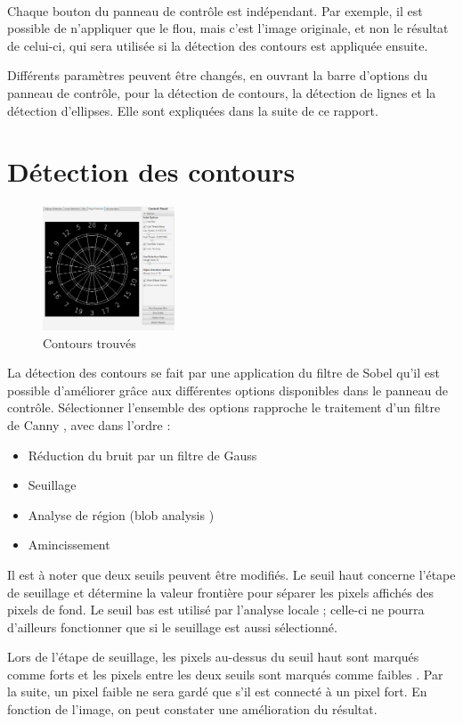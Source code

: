 \documentclass[a4paper, 11pt]{article}
\begin{document}
\paragraph{}
Chaque bouton du panneau de contrôle est indépendant. Par exemple, il est possible de n'appliquer que le flou, mais c'est l'image originale, et non le résultat de celui-ci, qui sera utilisée si la détection des contours est appliquée ensuite.\par
Différents paramètres peuvent être changés, en ouvrant la barre d'options du panneau de contrôle, pour la détection de contours, la détection de lignes et la détection d'ellipses. Elle sont expliquées dans la suite de ce rapport.

\section{Détection des contours}
\paragraph{}
\begin{figure}
\vspace{-4mm}
\centering
\includegraphics[width=0.35\textwidth]{img/front_edges_00.png}
\vspace{-8mm}
\caption{Contours trouvés}
\label{fig:frontEdges00}
\end{figure}
La détection des contours se fait par une application du filtre de Sobel qu'il est possible d'améliorer grâce aux différentes options disponibles dans le panneau de contrôle. Sélectionner l'ensemble des options rapproche le traitement d'un filtre de Canny \cite{wiki_canny}, avec dans l'ordre :
\begin{itemize}
\item Réduction du bruit par un filtre de Gauss
\item Seuillage
\item Analyse de région (\og blob analysis \fg{})
\item Amincissement
\end{itemize}
Il est à noter que deux seuils peuvent être modifiés. Le seuil haut concerne l'étape de seuillage et détermine la valeur frontière pour séparer les pixels affichés des pixels de fond. Le seuil bas est utilisé par l'analyse locale ; celle-ci ne pourra d'ailleurs fonctionner que si le seuillage est aussi sélectionné.\par
Lors de l'étape de seuillage, les pixels au-dessus du seuil haut sont marqués comme \og forts \fg{} et les pixels entre les deux seuils sont marqués comme \og faibles \fg{}. Par la suite, un pixel faible ne sera gardé que s'il est connecté à un pixel fort. En fonction de l'image, on peut constater une amélioration du résultat.
\end{document}
